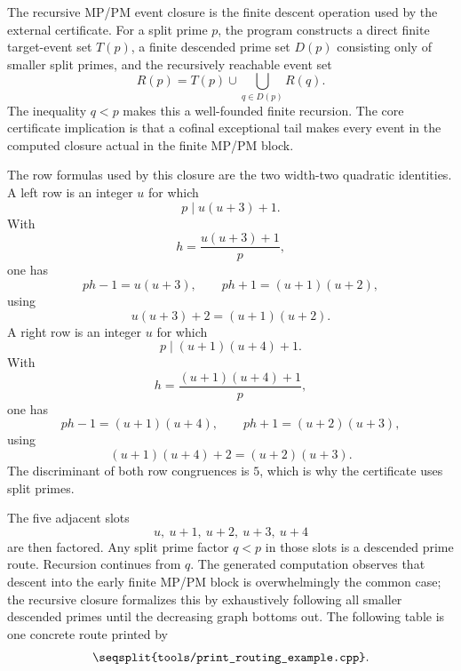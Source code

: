 \documentclass[11pt]{article}
\newcommand{\Code}[1]{\texttt{\seqsplit{#1}}}
\begin{document}
The recursive MP/PM event closure is the finite descent operation used by the
external certificate.  For a split prime \(p\), the program constructs a direct
finite target-event set \(T(p)\), a finite descended prime set \(D(p)\)
consisting only of smaller split primes, and the recursively reachable event
set
\[
  R(p)=T(p)\cup \bigcup_{q\in D(p)}R(q).
\]
The inequality \(q<p\) makes this a well-founded finite recursion.  The core
certificate implication is that a cofinal exceptional tail makes every event
in the computed closure actual in the finite MP/PM block.

The row formulas used by this closure are the two width-two quadratic
identities.  A left row is an integer \(u\) for which
\[
  p\mid u(u+3)+1.
\]
With
\[
  h=\frac{u(u+3)+1}{p},
\]
one has
\[
  ph-1=u(u+3),\qquad ph+1=(u+1)(u+2),
\]
using
\[
  u(u+3)+2=(u+1)(u+2).
\]
A right row is an integer \(u\) for which
\[
  p\mid (u+1)(u+4)+1.
\]
With
\[
  h=\frac{(u+1)(u+4)+1}{p},
\]
one has
\[
  ph-1=(u+1)(u+4),\qquad ph+1=(u+2)(u+3),
\]
using
\[
  (u+1)(u+4)+2=(u+2)(u+3).
\]
The discriminant of both row congruences is \(5\), which is why the certificate
uses split primes.

The five adjacent slots
\[
  u,\ u+1,\ u+2,\ u+3,\ u+4
\]
are then factored.  Any split prime factor \(q<p\) in those slots is a
descended prime route.  Recursion continues from \(q\).  The generated computation
observes that descent into the early finite MP/PM block is overwhelmingly the
common case; the recursive closure formalizes this by exhaustively following
all smaller descended primes until the decreasing graph bottoms out.  The following
table is one concrete route printed by
\[
  \Code{tools/print\_routing\_example.cpp}.
\]

\begin{center}
\end{center}
\end{document}
